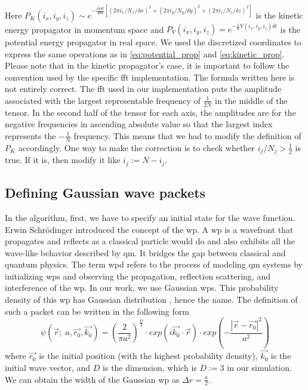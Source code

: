 Here $P_K(i_x, i_y, i_z) \sim e^{-\frac{i \hbar \delta t}{4m} \left[(2\pi i_x / N_x / \delta x)^2 + (2\pi i_y / N_y /\delta y)^2 + (2\pi i_z / N_z / \delta z)^2\right]}$ is the kinetic energy propagator in momentum space and $P_V(i_x, i_y, i_z) = e^{-\frac{i}{\hbar}V(i_x, i_y, i_z)\delta t}$ is the potential energy propagator in real space.
We used the discretized coordinates to express the same operations as in \ref{eq:potential_prop} and \ref{eq:kinetic_prop}.
Please note that in the kinetic propagator's case, it is important to follow the convention used by the specific \acrshort{fft} implementation.
The formula written here is not entirely correct.
The \acrshort{fft} used in our implementation puts the amplitude associated with the largest representable frequency of $\frac{1}{2N}$ in the middle of the tensor.
In the second half of the tensor for each axis, the amplitudes are for the negative frequencies in ascending absolute value so that the largest index represents the $-\frac{1}{N}$ frequency.
This means that we had to modify the definition of $P_K$ accordingly.
One way to make the correction is to check whether $i_j / N_j > \frac{1}{2}$ is true. If it is, then modify it like $i_j := N - i_j$.

\subsection{Defining Gaussian wave packets}

In the algorithm, first, we have to specify an initial state for the wave function.
Erwin Schrödinger introduced the concept of the \acrfull{wp}.
A \acrshort{wp} is a wavefront that propagates and reflects as a classical particle would do
and also exhibits all the wave-like behavior described by \acrshort{qm}.
It bridges the gap between classical and quantum physics.
The term \acrfull{wpd} refers to the process of modeling \acrshort{qm} systems by initializing \acrshort{wp}s
and observing the propagation, reflection scattering, and interference of the \acrshort{wp}.
In our work, we use Gaussian \acrshort{wp}s.
This probability density of this \acrshort{wp} has Gaussian distribution \cite{Zhang2010}, hence the name.
The definition of such a packet can be written in the following form
\begin{equation}
	\label{eq:gaussiaon_wp}
	\psi(\vec{r};\; a, \vec{r_0}, \vec{k_0}) = \left( \frac{2}{\pi a^2} \right)^{\frac{D}{4}} \cdot exp\left( i\vec{k_0} \cdot \vec{r} \right) \cdot exp \left( -\frac{|\vec{r} - \vec{r_0}|^2}{a^2} \right)
\end{equation}
where $\vec{r_0}$ is the initial position (with the highest probability density), $\vec{k_0}$ is the initial wave vector, and $D$ is the dimension, which is  $D:=3$ in our simulation.
We can obtain the width of the Gaussian \acrshort{wp} as $\Delta r = \frac{a}{2}$.


